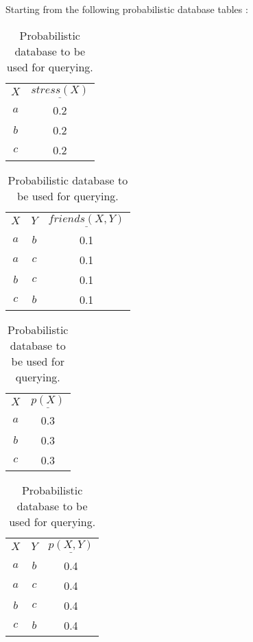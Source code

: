 


\noindent Starting from the following probabilistic database tables :

\begin{table}[h]

	\centering
	
	\begin{subtable}{.2\linewidth}{
	\centering
	\begin{tabular}{c|c}
		$X$ & $\underline{stress(X)}$\\
		$a$ & 0.2\\
		$b$ & 0.2\\
		$c$ & 0.2
	\end{tabular}}
	\label{tab:1a}
	\end{subtable}
	\begin{subtable}{.3\linewidth}{
	\centering
	\begin{tabular}{cc|c}
		$X$ & $Y$ & $\underline{friends(X,Y)}$\\
		$a$ & $b$ & 0.1\\
		$a$ & $c$ & 0.1\\
		$b$ & $c$ & 0.1\\
		$c$ & $b$ & 0.1\\
	\end{tabular}}
	\label{tab:2a}
	\end{subtable}
	\begin{subtable}{.2\linewidth}{
	\centering
	\begin{tabular}{c|c}
		$X$ & $\underline{p(X)}$\\
		$a$ & 0.3\\
		$b$ & 0.3\\
		$c$ & 0.3\\
	\end{tabular}}
	\label{tab:3a}
	\end{subtable}
	\begin{subtable}{.2\linewidth}{
	\centering
	\begin{tabular}{cc|c}
		$X$ & $Y$ & $\underline{p(X,Y)}$\\
		$a$ & $b$ & 0.4\\
		$a$ & $c$ & 0.4\\
		$b$ & $c$ & 0.4\\
		$c$ & $b$ & 0.4\\
	\end{tabular}}
	\label{tab:4a}
	\end{subtable}

	\caption{Probabilistic database to be used for querying.}\label{tab:probdata}

\end{table}


